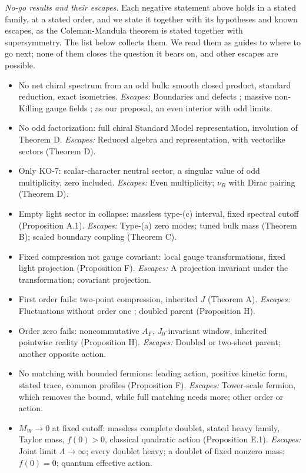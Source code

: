 \documentclass[aps,prd,reprint,onecolumn,nofootinbib,amsmath,amssymb,floatfix]{revtex4-2}
\theoremstyle{plain}
\begin{document}
\emph{No-go results and their escapes.} Each negative statement above holds in a stated family, at a stated order, and we state it together with its hypotheses and known escapes, as the Coleman-Mandula theorem is stated together with supersymmetry. The list below collects them. We read them as guides to where to go next; none of them closes the question it bears on, and other escapes are possible.

\begin{itemize}
\item No net chiral spectrum from an odd bulk: smooth closed product, standard reduction, exact isometries. \emph{Escapes:} Boundaries and defects \cite{HW1996}; massive non-Killing gauge fields \cite{Baptista2026}; as our proposal, an even interior with odd limits.
\item No odd factorization: full chiral Standard Model representation, involution of Theorem D. \emph{Escapes:} Reduced algebra and representation, with vectorlike sectors (Theorem D).
\item Only KO-7: scalar-character neutral sector, a singular value of odd multiplicity, zero included. \emph{Escapes:} Even multiplicity; $\nu_R$ with Dirac pairing (Theorem D).
\item Empty light sector in collapse: massless type-(c) interval, fixed spectral cutoff (Proposition A.1). \emph{Escapes:} Type-(a) zero modes; tuned bulk mass (Theorem B); scaled boundary coupling (Theorem C).
\item Fixed compression not gauge covariant: local gauge transformations, fixed light projection (Proposition F). \emph{Escapes:} A projection invariant under the transformation; covariant projection.
\item First order fails: two-point compression, inherited $J$ (Theorem A). \emph{Escapes:} Fluctuations without order one \cite{CCvS2013a}; doubled parent (Proposition H).
\item Order zero fails: noncommutative $A_F$, $J_0$-invariant window, inherited pointwise reality (Proposition H). \emph{Escapes:} Doubled or two-sheet parent; another opposite action.
\item No matching with bounded fermions: leading action, positive kinetic form, stated trace, common profiles (Proposition F). \emph{Escapes:} Tower-scale fermion, which removes the bound, while full matching needs more; other order or action.
\item $M_W\to0$ at fixed cutoff: massless complete doublet, stated heavy family, Taylor mass, $f(0)>0$, classical quadratic action (Proposition E.1). \emph{Escapes:} Joint limit $\Lambda\to\infty$; every doublet heavy; a doublet of fixed nonzero mass; $f(0)=0$; quantum effective action.

\end{itemize}
\end{document}
